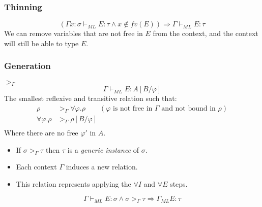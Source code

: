 \subsubsection{Thinning}
\[(\Gamma x:\sigma \vdash_{ML} E : \tau \land x \not\in fv(E)) \Rightarrow \Gamma \vdash_{ML} E : \tau \]
We can remove variables that are not free in $E$ from the context, and the context will still be able to type $E$.

\subsubsection{Generation}
\begin{definitionbox}{$>_\Gamma$}
	\[\Gamma \vdash_{ML} E : A[B / \varphi]\]
	The smallest reflexive and transitive relation such that:
	\[\begin{split}
			\rho & >_\Gamma \forall \varphi . \rho \qquad (\varphi \text{ is not free in }\Gamma\text{ and not bound in }\rho)\\
			\forall \varphi . \rho & >_\Gamma \rho[B / \varphi] \\
		\end{split}\]
	Where there are no free $\varphi'$ in $A$.
	\begin{itemize}
		\item If $\sigma >_\Gamma \tau$ then $\tau$ is a \textit{generic instance} of $\sigma$.
		\item Each context $\Gamma$ induces a new relation.
		\item This relation represents applying the $\forall I$ and $\forall E$ steps.
	\end{itemize}
	\[\Gamma \vdash_{ML} E : \sigma \land \sigma >_{\Gamma} \tau \Rightarrow \Gamma_{ML} E : \tau\]
\end{definitionbox}

